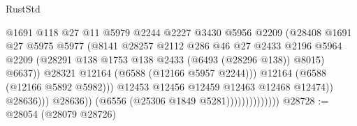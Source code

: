 \begin{lexlean}{RustStd}
\begin{coremodule}
                                              @1691
                                              @118
                                              @27
                                              @11
                                              @5979
                                              @2244
                                              @2227
                                              @3430
                                              @5956
                                              @2209
                                              (@28408
                                                @1691
                                                @27
                                                @5975
                                                @5977
                                                (@8141
                                                  @28257
                                                  @2112
                                                  @286
                                                  @46
                                                  @27
                                                  @2433
                                                  @2196
                                                  @5964
                                                  @2209
                                                  (@28291
                                                    @138
                                                    @1753
                                                    @138
                                                    @2433
                                                    (@6493 (@28296 @138))
                                                    @8015)
                                                  @6637))
                                              @28321
                                              @12164
                                              (@6588 (@12166 @5957 @2244)))
                                            @12164
                                            (@6588 (@12166 @5892 @5982)))
                                          @12453
                                          @12456
                                          @12459
                                          @12463
                                          @12468
                                          @12474))
                                      @28636)))
                                @28636))
                            (@6556 (@25306 @1849 @5281))))))))))))))
@28728 := @28054 (@28079 @28726)

\end{coremodule}
\end{lexlean}
